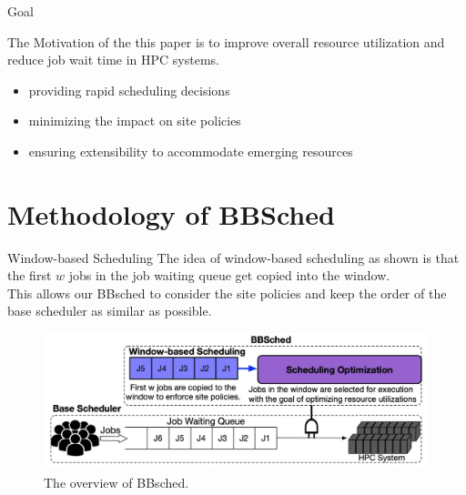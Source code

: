 \documentclass[aspectratio=1610]{beamer}
\begin{document}
\begin{frame}{Goal}

    The Motivation of the this paper is to improve overall resource utilization and reduce job wait time in HPC systems.

    \begin{itemize}
        \item providing rapid scheduling decisions
        \item minimizing the impact on site policies
        \item ensuring extensibility to accommodate emerging resources
    \end{itemize}
   
\end{frame}

\section{Methodology of BBSched}

\begin{frame}{Window-based Scheduling}
    The idea of window-based scheduling as shown is that the first $w$ jobs in the job waiting queue get copied into the window.   \\

    This allows our BBsched to consider the site policies and keep the order of the base scheduler as similar as possible. \\
    \begin{figure}[htpb]
        \centering
        \includegraphics[keepaspectratio, scale=0.2]{pic/BBSched.jpg}
        \caption{The overview of BBsched.}
        \label{fig:BBsched}
     \end{figure}
\end{frame}
\end{document}
